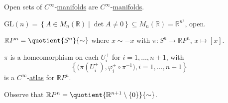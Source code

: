 \begin{eg}
	Open sets of \(C^{\infty} \)-\hyperref[def:smooth-manifold]{manifolds} are \(C^{\infty}\)-\hyperref[def:smooth-manifold]{manifolds}.
\end{eg}

\begin{eg}
	\(\mathrm{GL} (n) = \left\{ A\in M_n(\mathbb{R} ) \mid \det A \neq 0 \right\} \subseteq M_n(\mathbb{R} ) = \mathbb{R} ^{n^2}\), open.
\end{eg}

\begin{eg}
	\(\mathbb{R} P^n = \quotient{S^n}{\sim } \) where \(x \sim -x\) with \(\pi \colon S^n \to \mathbb{R} P^n\), \(x \mapsto [x]\).
\end{eg}
\begin{explanation}
	\(\pi \) is a homeomorphism on each \(U_i^+\) for \(i=1, \dots , n+1\), with
	\[
		\left\{ \big( \pi (U_i^+), \varphi _i^+ \circ \pi ^{-1} \big), i=1, \dots , n+1 \right\}
	\]
	is a \(C^{\infty} \)-\hyperref[def:differentiable-atlas]{atlas} for \(\mathbb{R} P^n\).
\end{explanation}

\begin{note}
	Observe that \(\mathbb{R} P^n = \quotient{\mathbb{R} ^{n+1} \setminus \left\{ 0 \right\} }{\sim } \).
\end{note}